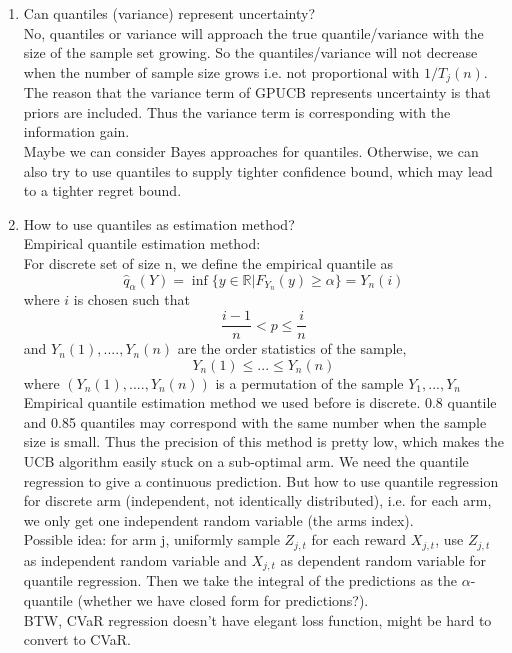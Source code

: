 \documentclass{article}
\begin{document}
\begin{enumerate}
\begin{enumerate}
    \item Can quantiles (variance) represent uncertainty?\\
    No, quantiles or variance will approach the true quantile/variance with the size of the sample set growing. So the quantiles/variance will not decrease when the number of sample size grows i.e. not proportional with $1/T_j(n)$.\\
    The reason that the variance term of GPUCB represents uncertainty is that priors are included. Thus the variance term is corresponding with the information gain. \\ 
    Maybe we can consider Bayes approaches for quantiles. Otherwise, we can also try to use quantiles to supply tighter confidence bound, which may lead to a tighter regret bound.
    
    \item How to use quantiles as estimation method?\\
    Empirical quantile estimation method: \\
    For discrete set of size n, we define the empirical quantile as
    $$\hat{q}_\alpha(Y) = \inf \{y \in \mathbb{R}| F_{Y_n} (y) \geq \alpha\} = Y_n(i)$$
    where $i$ is chosen such that
    $$\frac{i-1}{n} < p \leq \frac{i}{n}$$
    and $Y_n(1), ...., Y_n(n)$ are the order statistics of the sample,
    $$Y_n(1)\leq ...\leq Y_n(n)$$ 
    where $(Y_n(1), ...., Y_n(n))$ is a permutation of the sample $Y_1, ..., Y_n$\\
        
    Empirical quantile estimation method we used before is discrete. 0.8 quantile and 0.85 quantiles may correspond with the same number when the sample size is small. Thus the precision of this method is pretty low, which makes the UCB algorithm easily stuck on a sub-optimal arm. 
    We need the quantile regression to give a continuous prediction. But how to use quantile regression for discrete arm (independent, not identically distributed), i.e. for each arm, we only get one independent random variable (the arms index).\\
    Possible idea: for arm j, uniformly sample $Z_{j,t}$ for each reward $X_{j, t}$, use $Z_{j,t}$ as independent random variable  and $X_{j, t}$ as dependent random variable for quantile regression. Then we take the integral of the predictions as the $\alpha$-quantile (whether we have closed form for predictions?). \\
    BTW, CVaR regression doesn't have elegant loss function, might be hard to convert to CVaR.
    

\end{enumerate}
\end{enumerate}
\end{document}
